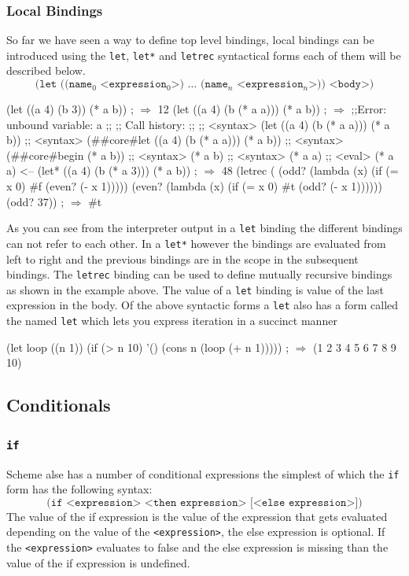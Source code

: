 \documentclass[12pt,a4paper,english,twoside]{article}
\begin{document}
\subsubsection{Local Bindings}
So far we have seen a way to define top level bindings, local bindings can be 
introduced using the \texttt{let}, \texttt{let*} and \texttt{letrec} 
syntactical forms each of them will be described below.
\begin{equation*}
\texttt{(let ((name$_{0}$ <expression$_{0}$>) $\dots$ (name$_{n}$ <expression$_{n}$>)) <body>)}
\end{equation*}
\begin{listing}
\begin{schemecode}
(let ((a 4) (b 3)) (* a b)) ; $\Rightarrow$ 12
(let ((a 4) (b (* a a))) (* a b)) ; $\Rightarrow$
;;Error: unbound variable: a
;;
;;	Call history:
;;
;;	<syntax>	  (let ((a 4) (b (* a a))) (* a b))
;;	<syntax>	  (##core#let ((a 4) (b (* a a))) (* a b))
;;	<syntax>	  (##core#begin (* a b))
;;	<syntax>	  (* a b)
;;	<syntax>	  (* a a)
;;	<eval>	  (* a a)	<--
(let* ((a 4) (b (* a 3))) (* a b)) ; $\Rightarrow$ 48
(letrec (
  (odd? (lambda (x) (if (= x 0) #f (even? (- x 1))))) 
  (even? (lambda (x) (if (= x 0) #t (odd? (- x 1)))))) 
    (odd? 37)) ; $\Rightarrow$ #t
\end{schemecode}
\end{listing}
As you can see from the interpreter output in a \texttt{let} binding the 
different bindings can not refer to each other. In a \texttt{let*} however the 
bindings are evaluated from left to right and the previous bindings are in the 
scope in the subsequent bindings. The \texttt{letrec} binding can be used to 
define mutually recursive bindings as shown in the example above. The value 
of a \texttt{let} binding is value of the last expression in the body. Of the above 
syntactic forms a \texttt{let} also has a form called the named \texttt{let} 
which lets you express iteration in a succinct manner
\begin{schemecode}
(let loop ((n 1))
  (if (> n 10)
    '()
    (cons n (loop (+ n 1))))) ; $\Rightarrow$ (1 2 3 4 5 6 7 8 9 10)
\end{schemecode}
\subsection{Conditionals}
\subsubsection{\texttt{if}}
Scheme alse has a number of conditional expressions the simplest of which the 
\texttt{if} form has the following syntax:
\begin{equation*}
    \texttt{(if <expression> <then expression> [<else expression>])}
\end{equation*}
The value of the if expression is the value of 
the expression that gets evaluated depending on the value of the 
\texttt{<expression>}, the else expression is optional. If the 
\texttt{<expression>} evaluates to false and the else expression is missing 
than the value of the if expression is undefined.
\end{document}

